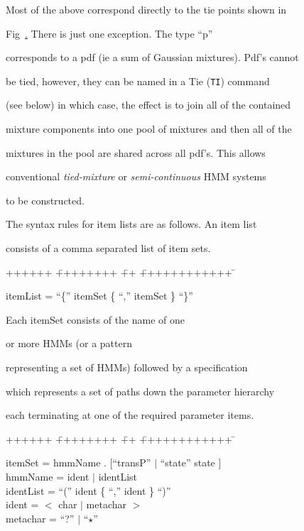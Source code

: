 Most of the above correspond directly to the tie points shown in


Fig~\href{f:hierarch}.  There is just one exception.  The type ``p''


corresponds to a pdf (ie a sum of Gaussian mixtures).  Pdf's cannot


be tied, however, they can be named in a Tie (\texttt{TI}) command


(see below) in which case, the effect is to join all of the contained


mixture components into one pool of mixtures and then all of the


mixtures in the pool are shared across all pdf's.  This allows


conventional {\it tied-mixture} or {\it semi-continuous} HMM systems


to be constructed.





The syntax rules for item lists are as follows.  An item list


consists of a comma separated list of item sets.


{\sf


\begin{tabbing}


++++++ \= ++++++++ \= ++ \= ++++++++++++ \=  \kill


\>     itemList\>  = \> ``\{'' itemSet \{ ``,'' itemSet \} ``\}'' 


\end{tabbing}}


\noindent


Each {\sf itemSet} consists of the name of one


or more HMMs (or a pattern


representing a set of HMMs) followed by a specification


which represents a set of paths down the parameter hierarchy 


each terminating at one of the required parameter items.


{\sf


\begin{tabbing}


++++++ \= ++++++++ \= ++ \= ++++++++++++ \=  \kill


\>      itemSet \>  = \> hmmName . [``transP'' $|$ ``state'' state ]\\


\>      hmmName \>  = \> ident $|$ identList \\


\>     identList\>  = \> ``('' ident \{ ``,'' ident \} ``)'' \\


\>     ident    \>  = \> $<$ char $|$ metachar $>$ \\


\>     metachar \>  = \> ``?'' $|$ ``$\star$''


\end{tabbing}}


